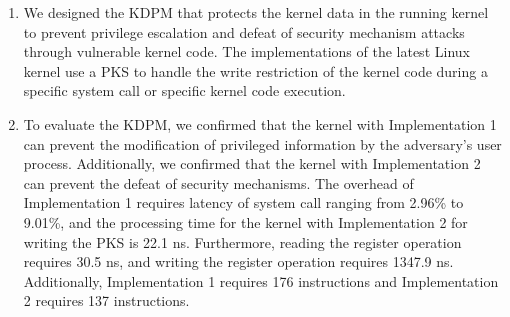 \begin{enumerate}%
\item We designed the KDPM that protects the kernel data in the running kernel to
prevent privilege escalation and defeat of security mechanism attacks through
vulnerable kernel code.
%
The implementations of the latest Linux kernel use a PKS to handle the write restriction
of the kernel code during a specific system call or specific kernel code execution.

% 


  \item 
To evaluate the KDPM,
we confirmed that the kernel with Implementation 1 can prevent the modification of privileged
information by the adversary's user process. Additionally, we confirmed that the kernel
with Implementation 2 can prevent the defeat of security mechanisms.
%
The overhead of Implementation 1 requires latency of system call ranging from
2.96\% to 9.01\%, 
and the processing time for the kernel with Implementation 2 for writing the PKS
is 22.1 ns. Furthermore, reading the register operation requires 30.5 ns, and
writing the register operation requires 1347.9 ns.
%
Additionally, Implementation 1 requires 176 instructions and Implementation 2
requires 137 instructions.


\end{enumerate}
